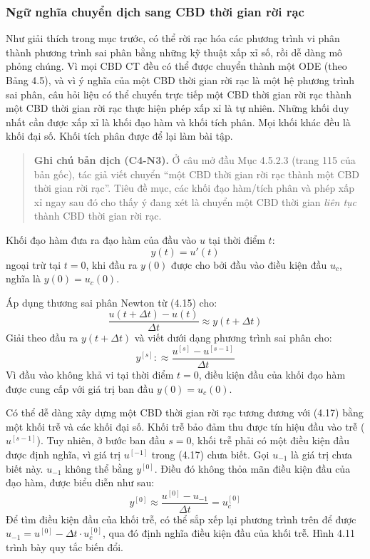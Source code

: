 \subsubsection{Ngữ nghĩa chuyển dịch sang CBD thời gian rời rạc}
Như giải thích trong mục trước, có thể rời rạc hóa các phương trình vi phân thành phương trình sai phân bằng những kỹ thuật xấp xỉ số, rồi dễ dàng mô phỏng chúng.
Vì mọi CBD CT đều có thể được chuyển thành một ODE (theo Bảng 4.5), và vì ý nghĩa của một CBD thời gian rời rạc là một hệ phương trình sai phân, câu hỏi liệu có thể chuyển trực tiếp một CBD thời gian rời rạc thành một CBD thời gian rời rạc thực hiện phép xấp xỉ là tự nhiên. Những khối duy nhất cần được xấp xỉ là khối đạo hàm và khối tích phân. Mọi khối khác đều là khối đại số. Khối tích phân được để lại làm bài tập.

\begin{quote}\small
\textbf{Ghi chú bản dịch (C4-N3).} Ở câu mở đầu Mục 4.5.2.3 (trang 115 của bản gốc), tác giả viết chuyển ``một CBD thời gian rời rạc thành một CBD thời gian rời rạc''. Tiêu đề mục, các khối đạo hàm/tích phân và phép xấp xỉ ngay sau đó cho thấy ý đang xét là chuyển một CBD thời gian \emph{liên tục} thành CBD thời gian rời rạc.
\end{quote}

Khối đạo hàm đưa ra đạo hàm của đầu vào $u$ tại thời điểm $t$:
\[y(t)=u'(t)\]
ngoại trừ tại $t=0$, khi đầu ra $y(0)$ được cho bởi đầu vào điều kiện đầu $u_c$, nghĩa là $y(0)=u_c(0)$.

Áp dụng thương sai phân Newton từ (4.15) cho:
\[\frac{u(t+\Delta t)-u(t)}{\Delta t}\approx y(t+\Delta t)\]
Giải theo đầu ra $y(t+\Delta t)$ và viết dưới dạng phương trình sai phân cho:
\begin{equation}y^{[s]}:\approx\frac{u^{[s]}-u^{[s-1]}}{\Delta t}\tag{4.17}\end{equation}
Vì đầu vào không khả vi tại thời điểm $t=0$, điều kiện đầu của khối đạo hàm được cung cấp với giá trị ban đầu $y(0)=u_c(0)$.

Có thể dễ dàng xây dựng một CBD thời gian rời rạc tương đương với (4.17) bằng một khối trễ và các khối đại số. Khối trễ bảo đảm thu được tín hiệu đầu vào trễ ($u^{[s-1]}$). Tuy nhiên, ở bước ban đầu $s=0$, khối trễ phải có một điều kiện đầu được định nghĩa, vì giá trị $u^{[-1]}$ trong (4.17) chưa biết. Gọi $u_{-1}$ là giá trị chưa biết này. $u_{-1}$ không thể bằng $y^{[0]}$. Điều đó không thỏa mãn điều kiện đầu của đạo hàm, được biểu diễn như sau:
\[y^{[0]}\approx\frac{u^{[0]}-u_{-1}}{\Delta t}=u_c^{[0]}\]
Để tìm điều kiện đầu của khối trễ, có thể sắp xếp lại phương trình trên để được $u_{-1}=u^{[0]}-\Delta t\cdot u_c^{[0]}$, qua đó định nghĩa điều kiện đầu của khối trễ. Hình 4.11 trình bày quy tắc biến đổi.

